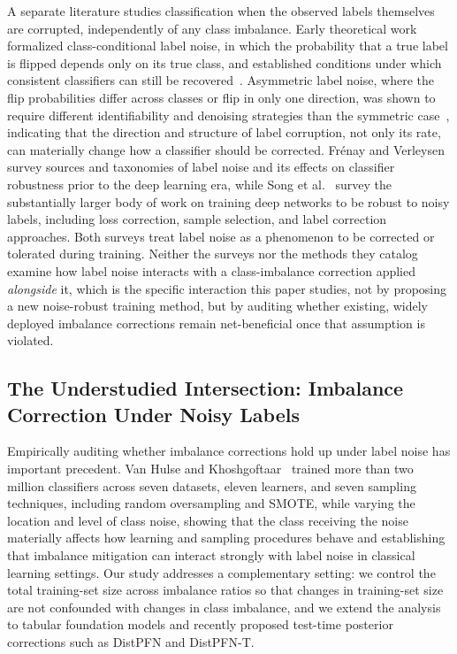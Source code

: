 A separate literature studies classification when the observed labels
themselves are corrupted, independently of any class imbalance. Early
theoretical work formalized class-conditional label noise, in which the
probability that a true label is flipped depends only on its true class, and
established conditions under which consistent classifiers can still be
recovered~\cite{natarajan2013noisylabels}. Asymmetric label noise, where the
flip probabilities differ across classes or flip in only one direction, was
shown to require different identifiability and denoising strategies than the
symmetric case~\cite{scott2013asymmetricnoise}, indicating that the direction
and structure of label corruption, not only its rate, can materially change
how a classifier should be corrected. Frénay and
Verleysen~\cite{frenay2014labelnoise} survey sources and taxonomies of label
noise and its effects on classifier robustness prior to the deep learning era,
while Song et al.~\cite{song2022noisylabelssurvey} survey the substantially
larger body of work on training deep networks to be robust to noisy labels,
including loss correction, sample selection, and label correction approaches.
Both surveys treat label noise as a phenomenon to be corrected or tolerated
during training. Neither the surveys nor the methods they catalog examine how
label noise interacts with a class-imbalance correction applied
\emph{alongside} it, which is the specific interaction this paper studies,
not by proposing a new noise-robust training method, but by auditing whether
existing, widely deployed imbalance corrections remain net-beneficial once
that assumption is violated.

\subsection{The Understudied Intersection: Imbalance Correction Under Noisy Labels}

Empirically auditing whether imbalance corrections hold up under label
noise has important precedent. Van Hulse and
Khoshgoftaar~\cite{vanhulse2009knowledge} trained more than two million
classifiers across seven datasets, eleven learners, and seven sampling
techniques, including random oversampling and SMOTE, while varying the
location and level of class noise, showing that the class receiving the
noise materially affects how learning and sampling procedures behave and
establishing that imbalance mitigation can interact strongly with label
noise in classical learning settings. Our study addresses a
complementary setting: we control the total training-set size across
imbalance ratios so that changes in training-set size are not confounded
with changes in class imbalance, and we extend the analysis to tabular
foundation models and recently proposed test-time posterior corrections
such as DistPFN and DistPFN-T.

